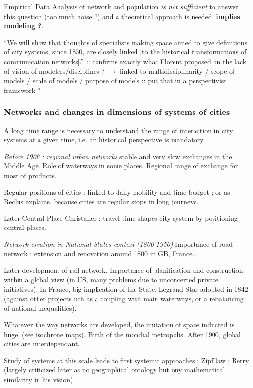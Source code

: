 Empirical Data Analysis of network and population \emph{is not sufficient} to answer this question (too much noise ?) and a theoretical approach is needed. \textbf{implies modeling ?}.

``We will show that thoughts of specialists making space aimed to give definitions of city systems, since 1830, are closely linked [to the historical transformations of communication networks].'' :: confirms exactly what Florent proposed on the lack of vision of modelers/disciplines ? $\rightarrow$ linked to multidisciplinarity / scope of models / scale of models / purpose of models :: put that in a perspectivist framework ? 


\subsubsection{Networks and changes in dimensions of systems of cities}

A long time range is necessary to understand the range of interaction in city systems at a given time, i.e. an historical perspective is mandatory.

\textit{Before 1900 : regional urban networks} stable and very slow exchanges in the Middle Age. Role of waterways in some places. Regional range of exchange for most of products.

Regular positions of cities : linked to daily mobility and time-budget ; or as Reclus explains, because cities are regular stops in long journeys.

Later Central Place Christaller : travel time shapes city system by positioning central places.

\textit{Network creation in National States context (1800-1950)} Importance of road network : extension and renovation around 1800 in GB, France.

Later development of rail network. Importance of planification and construction within a global view (in US, many problems due to unconcerted private initiatives).
In France, big implication of the State. Legrand Star adopted in 1842 (against other projects uch as a coupling with main waterways, or a rebalancing of national inequalities).

Whatever the way networks are developed, the mutation of space inducted is huge. (see isochrone maps). Birth of the mondial metropolis. After 1900, global cities are interdependant.

Study of systems at this scale leads to first systemic approaches ; Zipf law ; Berry (largely criticized later as no geographical ontology but ony mathematical similarity in his vision).

